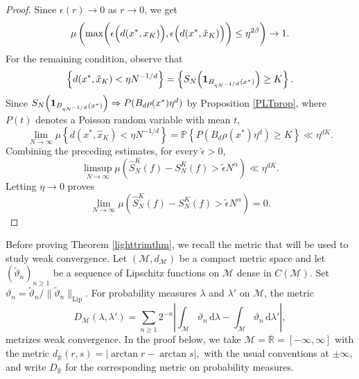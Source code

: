 \documentclass[11pt,twoside,a4paper,reqno]{amsart}
\renewcommand{\d}{\, \text{d}}
\newcommand{\s}[2]{(#1_#2)_{#2 \geq 1}}
\newcommand{\M}{\mathcal{M}}
\renewcommand{\P}{\mathbb{P}}
\def\one{{\mathbf{1}}}
\begin{document}
\begin{proof}
Since $\epsilon(r)\to0$ as $r\to0$, we get
$$
\mu\left(\max\biggl(\epsilon\Bigl(d(x^*,x_K)\Bigr), \epsilon\Bigl(d(x^*,\hat{x}_K)\Bigr)\biggr) \leq \eta^{2\beta}\right)\to 1.
$$
For the remaining condition, observe that
$$
\left\{d(x^*,\hat{x}_K)<\eta N^{-1/d}\right\}=\left\{S_N\Bigl(\one_{B_{\eta N^{-1/d}}(x^*)}\Bigr)\ge K\right\}.
$$
Since $S_N\Bigl(\one_{B_{\eta N^{-1/d}}(x^*)}\Bigr)\Rightarrow P(B_d\rho(x^*)\eta^d)$ by Proposition \ref{PLTprop}, where $P(t)$ denotes a Poisson random variable with mean $t$,
$$\lim_{N\to\infty}
\mu\left\{d(x^*,\hat{x}_K)<\eta N^{-1/d}\right\}=
\P\left\{P(B_d\rho(x^*)\eta^d)\ge K \right\} \ll \eta^{dK}.
$$
Combining the preceding estimates, for every $\tilde\epsilon>0$,
$$
\limsup_{N\to\infty}
\mu\left(
\hat{S}_N^K(f)-S_N^K(f)>\tilde\epsilon N^\alpha
\right)\ll\eta^{dK}.
$$
Letting $\eta\to0$ proves
$$
\lim_{N\to\infty}
\mu\left(
\hat{S}_N^K(f)-S_N^K(f)>\tilde\epsilon N^\alpha
\right)=0.
$$
\end{proof}


Before proving Theorem \ref{lighttrimthm}, we recall the metric that will be used to study weak convergence. Let $(\M,d_\M)$ be a compact metric space and let $\s{\tilde{\vartheta}}{n}$ be a sequence of Lipschitz functions on $\M$ dense in $C(\M)$. Set $\vartheta_n=\tilde{\vartheta}_n/\|\tilde{\vartheta}_n\|_{\mathrm{Lip}}$. For probability measures $\lambda$ and $\lambda'$ on $\M$, the metric
\begin{equation}\label{DK}
D_{\M}(\lambda,\lambda')=\sum_{n\geq 1} 2^{-n} \left|\int_{\M} \vartheta_n \d\lambda- \int_{\M} \vartheta_n \d\lambda'\right|,
\end{equation}
metrizes weak convergence. In the proof below, we take $\M=\overline{\mathbb R}=[-\infty,\infty]$ with the metric $d_{\overline{\mathbb R}}(r,s)=|\arctan r-\arctan s|,$ with the usual conventions at $\pm\infty$, and write $D_{\overline{\mathbb R}}$ for the corresponding metric on probability measures.
\end{document}
